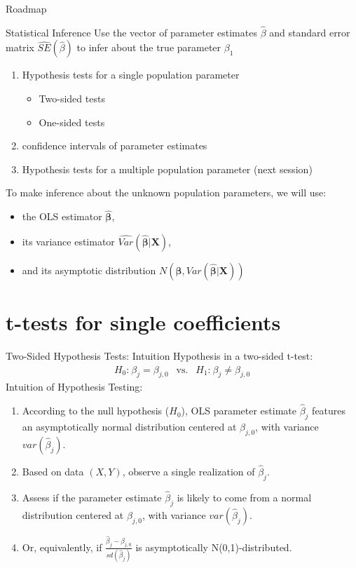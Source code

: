 \documentclass[11pt, aspectratio = 169]{beamer}
\begin{document}
\begin{frame}{Roadmap}
\begin{block}{Statistical Inference}
    Use the vector of parameter estimates $\hat{\beta}$ and standard error matrix $\widehat{SE}(\hat{\beta})$ to infer about the true parameter $\beta_1$
\end{block}
\pause
\begin{enumerate}
    \item Hypothesis tests for a single population parameter
    \begin{itemize}
        \item Two-sided tests
        \item One-sided tests
    \end{itemize}
    \item confidence intervals of parameter estimates \pause
    \item Hypothesis tests for a multiple population parameter (next session)
\end{enumerate}
\pause 
To make inference about the unknown population parameters, we will use: 
\begin{itemize}
    \item the OLS estimator $\hat{\boldsymbol{\beta}}$,
    \item its variance estimator $\widehat{Var}(\boldsymbol{\hat{\beta}|X})$,
    \item and its asymptotic distribution $N(\boldsymbol{\beta},  Var(\boldsymbol{\hat{\beta}|X}))$
\end{itemize}
\end{frame}

\section{t-tests for single coefficients}

\begin{frame}{Two-Sided Hypothesis Tests: Intuition}
\vspace{+0.2cm}
Hypothesis in a \alert{two-sided} t-test: 
\begin{align*}
    H_{0}\text{:}\: \beta_j = \beta_{j,0} \:\: \text{  vs.  } \:\: H_1\text{:}\: \beta_j \neq \beta_{j,0} 
\end{align*}
\pause 
Intuition of Hypothesis Testing:
\begin{enumerate}
\item According to the null hypothesis ($H_0$), OLS parameter estimate $\hat{\beta}_j$ features an asymptotically normal distribution centered at $\beta_{j,0}$, with variance $var(\hat{\beta}_j)$.
\item  Based on data $(X,Y)$, observe a single realization of $\hat{\beta}_j$.
\item  Assess if the parameter estimate $\hat{\beta}_j$ is likely to come from a normal distribution centered at $\beta_{j,0}$, with variance $var(\hat{\beta}_j)$.
\pause
\item Or, equivalently, if $\frac{\hat{\beta}_j - \beta_{j,0}}{sd(\hat{\beta}_j)}$ is asymptotically N(0,1)-distributed.
\end{enumerate}
\end{frame}
\end{document}
